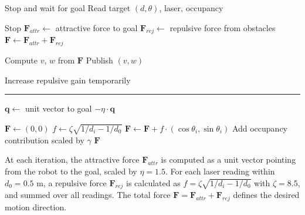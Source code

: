 \documentclass[robotics,article,submit,pdftex,moreauthors]{Definitions/mdpi}
\begin{document}
\begin{algorithm}
\caption{Pseudocode for the Potential Fields (PF) Baseline}
\label{alg:pf_reactive}
\begin{algorithmic}[1]


        \State Stop and wait for goal
    \Else
        \State Read target $(d, \theta)$, laser, occupancy
        
            \State Stop
        \Else
            \State $\mathbf{F}_{attr} \gets$ attractive force to goal
            \State $\mathbf{F}_{rej} \gets$ repulsive force from obstacles
            \State $\mathbf{F} \gets \mathbf{F}_{attr} + \mathbf{F}_{rej}$
            
            \State Compute $v$, $w$ from $\mathbf{F}$
            \State Publish $(v, w)$
            
                \State Increase repulsive gain temporarily
            \EndIf
        \EndIf
    \EndIf

\EndWhile

\vspace{0.2cm}
\hrule
\vspace{0.2cm}

    \State $\mathbf{q} \gets$ unit vector to goal
    \State \Return $-\eta \cdot \mathbf{q}$
\EndFunction

\vspace{0.2cm}

    \State $\mathbf{F} \gets (0,0)$
        \State $f \gets \zeta \sqrt{1/d_i - 1/d_0}$
        \State $\mathbf{F} \gets \mathbf{F} + f \cdot (\cos\theta_i, \sin\theta_i)$
    \EndFor
    \State Add occupancy contribution scaled by $\gamma$
    \State \Return $\mathbf{F}$
\EndFunction

\end{algorithmic}
\end{algorithm}

At each iteration, the attractive force $\mathbf{F}_{attr}$ is computed as a unit vector pointing from the robot to the goal, scaled by $\eta = 1.5$. For each laser reading within $d_0 = 0.5$ m, a repulsive force $\mathbf{F}_{rej}$ is calculated as $f = \zeta \sqrt{1/d_i - 1/d_0}$ with $\zeta = 8.5$, and summed over all readings. The total force $\mathbf{F} = \mathbf{F}_{attr} + \mathbf{F}_{rej}$ defines the desired motion direction.
\end{document}
